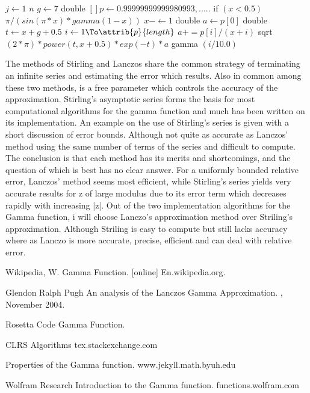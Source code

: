 \documentclass[11pt]{article}
\begin{document}
\begin{codebox}
	\li \For $j \gets 1$ \To $n$
	\li	$ g \gets 7$
	\li double $[ ] p \gets 0.99999999999980993,.....$
	\li	if $(x < 0.5)$ 
	\li  $ \pi / (sin(\pi * x)*gamma(1-x))$
	\li	$x  -\gets 1$
	\li	double $a \gets p[0] $
	\li double $ t \gets x+g+0.5$
	\li	\For $ i \gets 1 \To \attrib{p}{length}$
	\li $ a += p[i]/(x+i)$
	\End
	\li sqrt $(2 * \pi) * power (t, x+0.5)* exp(-t)*a$
	\li gamma $(i/10.0)$
	\End
\end{codebox}
\newpage
The methods of Stirling and Lanczos share the common strategy of terminating an infinite series and estimating the error which results. Also in common among these two methods, is a free parameter which controls the accuracy of the approximation.
Stirling’s asymptotic series forms the basis for most computational algorithms for the gamma function and much has been written on its implementation. An example on the use of Stirling’s series is given with a short discussion of error bounds.
Although not quite as accurate as Lanczos’ method using the same number of terms of the series and difficult to compute.\\
The conclusion is that each method has its merits and shortcomings, and the question of which is best has no clear answer. For a uniformly bounded relative error, Lanczos’ method seems most efficient, while Stirling’s series yields very accurate results for z of large modulus due to its error term which decreases rapidly with increasing |z|. 
\newline
Out of the two implementation algorithms for the Gamma function, i will choose Lanczo's approximation method over Striling's approximation. Although Striling is easy to compute but still lacks accuracy where as Lanczo is more accurate, precise, efficient and can deal with relative error.


\newpage
  
% 
\begin{thebibliography}{1}

\bibitem{}
\newblock Wikipedia, W. Gamma Function. [online] En.wikipedia.org.

\bibitem{}
Glendon Ralph Pugh
\newblock An analysis of the Lanczos Gamma Approximation.
, November 2004.

\bibitem{}
Rosetta Code
\newblock Gamma Function.

\bibitem{}
\newblock CLRS Algorithms
\newblock tex.stackexchange.com

\bibitem{}
\newblock Properties of the Gamma function.  
\newblock www.jekyll.math.byuh.edu

\bibitem{}
Wolfram Research
\newblock Introduction to the Gamma function.
\newblock functions.wolfram.com







\end{thebibliography}
\end{document}
